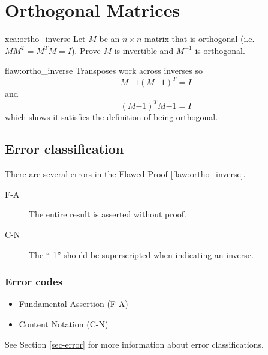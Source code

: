 \section{Orthogonal Matrices}

\begin{xca}{xca:ortho_inverse}
Let $M$ be an $n\times n$ matrix that is orthogonal (i.e. $MM^T = M^TM = I$). Prove $M$ is invertible and $M^{-1}$ is orthogonal.
\end{xca}

\begin{flaw}{flaw:ortho_inverse} %
Transposes work across inverses so
$$M{-1}(M{-1})^T = I $$
and
$$(M{-1})^TM{-1} = I $$
which shows it satisfies the definition of being orthogonal.
\end{flaw}

\clearpage
\subsection{Error classification}


There are several errors
 in the Flawed Proof \ref{flaw:ortho_inverse}.

 \begin{description}
    \item[F-A] The entire result is asserted without proof.
    \item[C-N] The ``-1'' should be superscripted when indicating an inverse.



 	
 \end{description}


\subsubsection{Error codes}
\begin{itemize}
    \item Fundamental Assertion (F-A)
    \item Content Notation (C-N)
\end{itemize}
See Section \ref{sec-error} for more information about error classifications.

